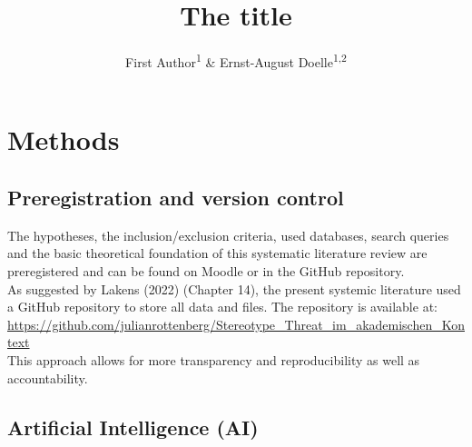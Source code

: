 \documentclass[
  stu,floatsintext]{apa7}
\title{The title}
\author{First Author\textsuperscript{1} \& Ernst-August Doelle\textsuperscript{1,2}}
\date{}
\affiliation{\vspace{0.5cm}\textsuperscript{1} Wilhelm-Wundt-University\\\textsuperscript{2} Konstanz Business School}
\begin{document}
\maketitle

\section{Methods}\label{methods}

\subsection{Preregistration and version control}\label{preregistration-and-version-control}

The hypotheses, the inclusion/exclusion criteria, used databases, search queries and the basic theoretical foundation of this systematic literature review are preregistered and can be found on Moodle or in the GitHub repository.\\
As suggested by Lakens (2022) (Chapter 14), the present systemic literature used a GitHub repository to store all data and files. The repository is available at: \url{https://github.com/julianrottenberg/Stereotype_Threat_im_akademischen_Kontext}\\
This approach allows for more transparency and reproducibility as well as accountability.

\subsection{Artificial Intelligence (AI)}\label{artificial-intelligence-ai}
\end{document}
